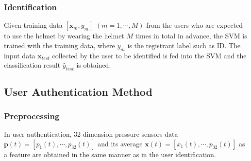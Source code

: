 \documentclass[sigchi,authordraft]{acmart}
\begin{document}
\subsubsection{Identification}
Given training data $[\bm{x}_m,y_m]$ $(m=1,\cdots, M)$ from the users who are expected to use the helmet by wearing the helmet $M$ times in total in advance, the SVM is trained with the training data, where $y_m$ is the registrant label such as ID. The input data $\bm{x}_{test}$ collected by the user to be identified is fed into the SVM and the classification result $\hat{y}_{test}$ is obtained.


\subsection{User Authentication Method}
\subsubsection{Preprocessing}
In user authentication, 32-dimension pressure sensors data $\bm{p}(t)=[p_1(t),\cdots,p_{32}(t)]$ and its average $\bm{x}(t)=[x_{1}(t),\cdots,p_{32}(t)]$ as a feature are obtained in the same manner as in the user identification. 

\end{document}
